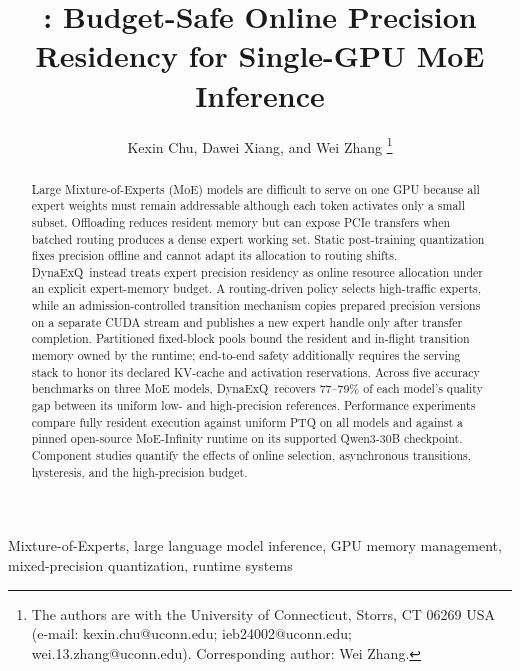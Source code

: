 \documentclass[journal]{IEEEtran}
\title{\systemname: Budget-Safe Online Precision Residency for Single-GPU MoE Inference}
\author{Kexin Chu, Dawei Xiang, and Wei Zhang%
\thanks{The authors are with the University of Connecticut, Storrs, CT 06269
USA (e-mail: kexin.chu@uconn.edu; ieb24002@uconn.edu;
wei.13.zhang@uconn.edu). Corresponding author: Wei Zhang.}}
\newcommand{\systemname}{DynaExQ}
\begin{document}
\maketitle

\begin{abstract}
Large Mixture-of-Experts (MoE) models are difficult to serve on one GPU because all expert weights must remain addressable although each token activates only a small subset. Offloading reduces resident memory but can expose PCIe transfers when batched routing produces a dense expert working set. Static post-training quantization fixes precision offline and cannot adapt its allocation to routing shifts. \systemname\ instead treats expert precision residency as online resource allocation under an explicit expert-memory budget. A routing-driven policy selects high-traffic experts, while an admission-controlled transition mechanism copies prepared precision versions on a separate CUDA stream and publishes a new expert handle only after transfer completion. Partitioned fixed-block pools bound the resident and in-flight transition memory owned by the runtime; end-to-end safety additionally requires the serving stack to honor its declared KV-cache and activation reservations. Across five accuracy benchmarks on three MoE models, \systemname\ recovers 77--79\% of each model's quality gap between its uniform low- and high-precision references. Performance experiments compare fully resident execution against uniform PTQ on all models and against a pinned open-source MoE-Infinity runtime on its supported Qwen3-30B checkpoint. Component studies quantify the effects of online selection, asynchronous transitions, hysteresis, and the high-precision budget.
\end{abstract}

\begin{IEEEkeywords}
Mixture-of-Experts, large language model inference, GPU memory management, mixed-precision quantization, runtime systems
\end{IEEEkeywords}














\end{document}
